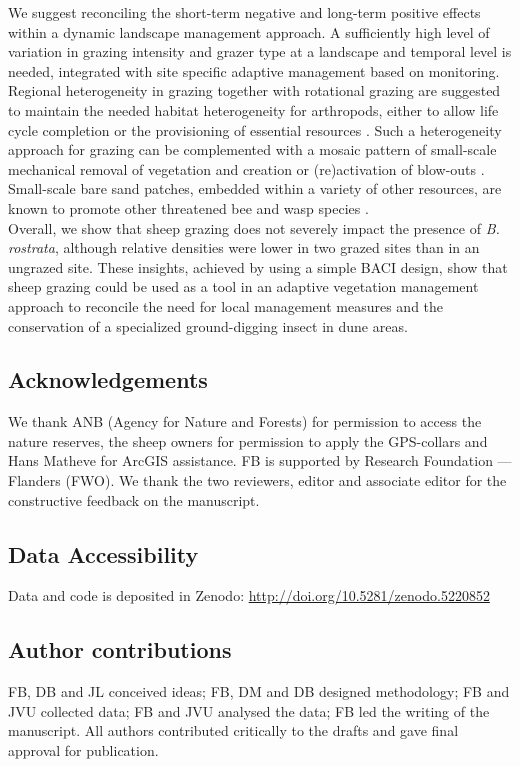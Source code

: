 \documentclass[10pt, twoside]{book} %
\begin{document}
	We suggest reconciling the short-term negative and long-term positive effects within a dynamic landscape management approach. A sufficiently high level of variation in grazing intensity and grazer type at a landscape and temporal level is needed, integrated with site specific adaptive management based on monitoring. Regional heterogeneity in grazing together with rotational grazing are suggested to maintain the needed habitat heterogeneity for arthropods, either to allow life cycle completion \citep{vannoordwijk2012} or the provisioning of essential resources \citep{maes2006a}. Such a heterogeneity approach for grazing can be complemented with a mosaic pattern of small-scale mechanical removal of vegetation and creation or (re)activation of blow-outs \citep{vanboxel1997}. Small-scale bare sand patches, embedded within a variety of other resources, are known to promote other threatened bee and wasp species \citep{heneberg2013, heneberg2014}.\\
	
	Overall, we show that sheep grazing does not severely impact the presence of \textit{B. rostrata}, although relative densities were lower in two grazed sites than in an ungrazed site. These insights, achieved by using a simple BACI design, show that sheep grazing could be used as a tool in an adaptive vegetation management approach to reconcile the need for local management measures and the conservation of a specialized ground-digging insect in dune areas.\\
	
	\vspace*{\fill}
	\subsection*{Acknowledgements}
	We thank ANB (Agency for Nature and Forests) for permission to access the nature reserves, the sheep owners for permission to apply the GPS-collars and Hans Matheve for ArcGIS assistance. FB is supported by Research Foundation --- Flanders (FWO). We thank the two reviewers, editor and associate editor for the constructive feedback on the manuscript.
	
	\subsection*{Data Accessibility}
	Data and code is deposited in Zenodo: \url{http://doi.org/10.5281/zenodo.5220852}
	
	\subsection*{Author contributions}
	FB, DB and JL conceived ideas; FB, DM and DB designed methodology; FB and JVU collected data; FB and JVU analysed the data; FB led the writing of the manuscript. All authors contributed critically to the drafts and gave final approval for publication.
\end{document}

